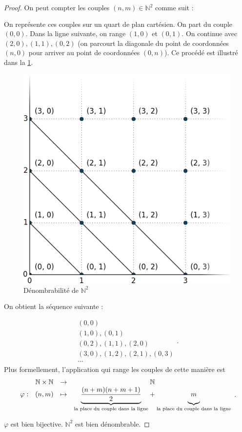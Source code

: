 \documentclass[a4paper,french,final]{memoir}
\begin{document}
\begin{proof} 
	On peut compter les couples $(n,m) \in \mathbb{N}^2$ comme suit : \par On représente ces couples sur un quart de plan cartésien. 
	On part du couple $(0, 0)$. Dans la ligne suivante, on range $(1,0) $ et $(0,1)$. On continue avec $(2,0), (1,1), (0,2)$ (on parcourt la diagonale du point de coordonnées $(n,0)$ pour arriver au point de coordonnées $(0,n)$). Ce procédé est illustré dans la  \cref{fig-n_croix_n}.
	\begin{figure}[htb]
		\centering
		\includegraphics[scale=0.3]{n_croix_n.png}
		\caption{Dénombrabilité de $\mathbb{N}^2$}
		\label{fig-n_croix_n}
	\end{figure}
	
	On obtient la séquence suivante :
	
	\[\begin{array}{l}
		(0,0) \\
		(1,0), (0,1) \\
		(0,2), (1,1), (2,0) \\
		(3,0), (1,2), (2,1), (0,3) \\
		\cdots
	\end{array}.\]
	Plus formellement, l'application qui range les couples de cette manière est 
	\[\begin{array}{cccc}
		\ & \mathbb{N} \times \mathbb{N} & \to & \mathbb{N} \\
		\varphi : & (n,m) & \mapsto & {\underbrace{\frac{(n+m)(n+m+1)}{2}}_{\text{la place du couple dans la ligne}}} +  {\underbrace{\vphantom{\frac{(n+m)(n+m+1)}{2}} m}_{\text{la place du couple dans la ligne}}}
	\end{array}.\]
	
	
	$\varphi$ est bien bijective. $\mathbb{N}^2$ est bien dénombrable.
\end{proof}
\end{document}
